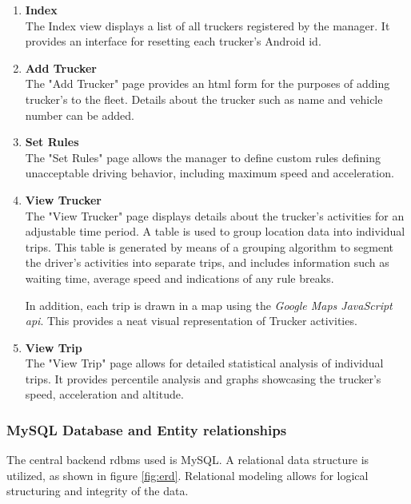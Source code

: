 \begin{enumerate}
\begin{enumerate}
\item \textbf{Index}\\
The Index view displays a list of all truckers registered by the manager.
It provides an interface for resetting each trucker's Android \ac{id}.

\item \textbf{Add Trucker}\\
The "Add Trucker" page provides an \ac{html} form for the purposes of adding trucker's to the fleet.
Details about the trucker such as name and vehicle number can be added.

\item \textbf{Set Rules}\\
The "Set Rules" page allows the manager to define custom rules defining unacceptable driving behavior, including maximum speed and acceleration.

\item \textbf{View Trucker}\\
The "View Trucker" page displays details about the trucker's activities for an adjustable time period.
A table is used to group location data into individual trips.
This table is generated by means of a grouping algorithm to segment the driver's activities into separate trips, and includes information such as waiting time, average speed and indications of any rule breaks.

In addition, each trip is drawn in a map using the \textit{Google Maps JavaScript \ac{api}}.
This provides a neat visual representation of Trucker activities.

\item \textbf{View Trip}\\
The "View Trip" page allows for detailed statistical analysis of individual trips.
It provides percentile analysis and graphs showcasing the trucker's speed, acceleration and altitude.
\end{enumerate}

\end{enumerate}

\pagebreak
\subsubsection{MySQL Database and Entity relationships}
The central backend \ac{rdbms} used is MySQL.
A relational data structure is utilized, as shown in figure \ref{fig:erd}.
Relational modeling allows for logical structuring and integrity of the data.

